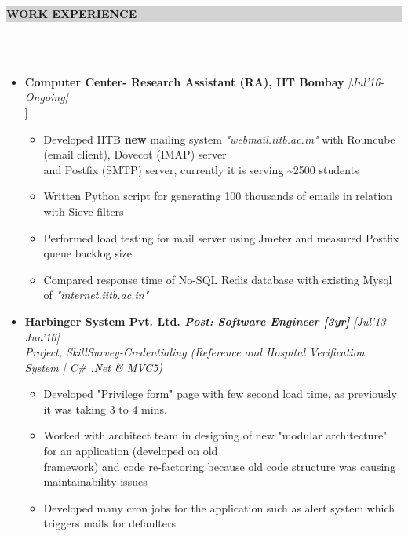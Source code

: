 \documentclass[a4paper,10pt]{article}
\newcommand{\lsep}{-0.5cm}
\newcommand{\hsep}{-0.6cm}
\newcommand{\resheading}[1]{{\small \colorbox{lightgray}{\begin{minipage}{1\textwidth}{\textbf{#1 \vphantom{p\^{E}}}}\end{minipage}}}}
\begin{document}
\hspace{-0.5cm}
\resheading{\textbf{\large WORK EXPERIENCE }}\\[\lsep] \\[-0.4cm]
\begin{itemize}
    \item \textbf{Computer Center- Research Assistant (RA), IIT Bombay } \hfill\emph{[Jul'16-Ongoing]}  \\[-0.55cm] ]
       \begin{itemize}
       \item Developed IITB \textbf{new} mailing system \textit{"webmail.iitb.ac.in"} with Rouncube (email client), Dovecot (IMAP) server\\[-0.05cm] and Postfix (SMTP) server, currently it is serving \textasciitilde2500 students\\[-0.55cm] 
       \item Written Python script for generating 100 thousands of emails in relation with Sieve filters\\[-0.55cm] 
       \item Performed load testing for mail server using Jmeter and measured Postfix queue backlog size\\[-0.55cm] 
       \item Compared response time of No-SQL Redis database with existing Mysql of \textit{"internet.iitb.ac.in"}\\[-0.55cm] 
	   \end{itemize}
    \item \textbf{Harbinger System Pvt. Ltd. \textit{Post: Software Engineer [3yr]}}  \hfill\emph{[Jul'13-Jun'16]} \\
    \emph{Project, SkillSurvey-Credentialing (Reference and Hospital Verification System | C\# .Net \& MVC5)} \\[\hsep]
        \begin{itemize}
	        \item Developed  "Privilege form" page with few second load time, as previously it was taking 3 to 4 mins.\\[-0.55cm] 
	       \item Worked with architect team in designing of new "modular architecture" for an application (developed on old\\[-0.05cm] framework) and code re-factoring because old code structure was causing maintainability issues\\[-0.55cm] 
	         \item Developed  many cron jobs for the application such as alert system which triggers mails for defaulters\\

\end{itemize}
\end{itemize}
\end{document}
